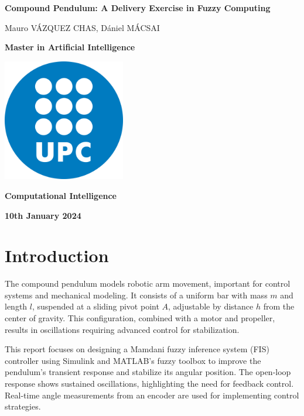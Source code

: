 \documentclass[12pt]{article}
\begin{document}
\begin{titlepage}
    \centering
    \vspace*{3cm}
    {\Huge\bfseries Compound Pendulum: A Delivery Exercise in Fuzzy Computing\par}
    \vspace{1.5cm}
    {\large Mauro V\'AZQUEZ CHAS, D\'aniel M\'ACSAI \par}
    \vspace{3cm}
    {\large \textbf{Master in Artificial Intelligence}\par}
    \includegraphics[width=0.4\textwidth]{Logo_UPC.png}\par\vspace{1cm}
    {\large \textbf{Computational Intelligence}\par}
    \vspace{1cm}
    {\large\bfseries 10th January 2024\par}
\end{titlepage}

\pagestyle{empty}

\newpage
\tableofcontents
\newpage

\setcounter{page}{1}
\pagestyle{plain}

\section{Introduction}
\label{sec:introduction}

The compound pendulum models robotic arm movement, important for control systems and mechanical modeling. It consists of a uniform bar with mass \( m \) and length \( l \), suspended at a sliding pivot point \( A \), adjustable by distance \( h \) from the center of gravity. This configuration, combined with a motor and propeller, results in oscillations requiring advanced control for stabilization.

This report focuses on designing a Mamdani fuzzy inference system (FIS) controller using Simulink and MATLAB’s fuzzy toolbox to improve the pendulum’s transient response and stabilize its angular position. The open-loop response shows sustained oscillations, highlighting the need for feedback control. Real-time angle measurements from an encoder are used for implementing control strategies.
\end{document}
